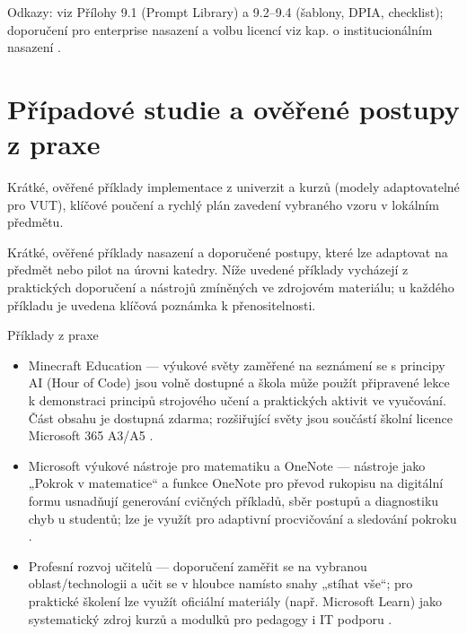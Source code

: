 \documentclass{report}%
\begin{document}
Odkazy: viz Přílohy 9.1 (Prompt Library) a 9.2–9.4 (šablony, DPIA, checklist); doporučení pro enterprise nasazení a volbu licencí viz kap. o institucionálním nasazení \cite{kb_ai_101_tipu_pdf_04e4a115_page_15_2, kb_ai_101_tipu_pdf_04e4a115_page_8_1}.%

%
\section{Případové studie a ověřené postupy z praxe}%
Krátké, ověřené příklady implementace z univerzit a kurzů (modely adaptovatelné pro VUT), klíčové poučení a rychlý plán zavedení vybraného vzoru v lokálním předmětu.%


%
Krátké, ověřené příklady nasazení a doporučené postupy, které lze adaptovat na předmět nebo pilot na úrovni katedry. Níže uvedené příklady vycházejí z praktických doporučení a nástrojů zmíněných ve zdrojovém materiálu; u každého příkladu je uvedena klíčová poznámka k přenositelnosti.

Příklady z praxe
\begin{itemize}
  \item Minecraft Education — výukové světy zaměřené na seznámení se s principy AI (Hour of Code) jsou volně dostupné a škola může použít připravené lekce k demonstraci principů strojového učení a praktických aktivit ve vyučování. Část obsahu je dostupná zdarma; rozšiřující světy jsou součástí školní licence Microsoft 365 A3/A5 \cite{kb_ai_101_tipu_pdf_04e4a115_page_15_2}.
  \item Microsoft výukové nástroje pro matematiku a OneNote — nástroje jako „Pokrok v matematice“ a funkce OneNote pro převod rukopisu na digitální formu usnadňují generování cvičných příkladů, sběr postupů a diagnostiku chyb u studentů; lze je využít pro adaptivní procvičování a sledování pokroku \cite{kb_ai_101_tipu_pdf_04e4a115_page_8_1}.
  \item Profesní rozvoj učitelů — doporučení zaměřit se na vybranou oblast/technologii a učit se v hloubce namísto snahy „stíhat vše“; pro praktické školení lze využít oficiální materiály (např. Microsoft Learn) jako systematický zdroj kurzů a modulků pro pedagogy i IT podporu \cite{kb_ai_101_tipu_pdf_04e4a115_page_54_1}.
\end{itemize}
\end{document}
